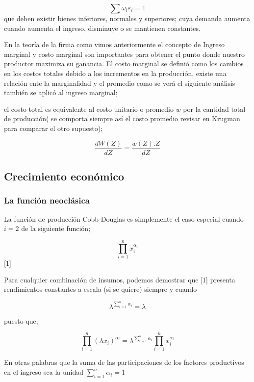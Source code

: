 \documentclass[12pt]{article}
\begin{document}
$$ \sum \omega_{i} \varepsilon_{i}=1 $$  que deben existir bienes inferiores,  normales y superiores; cuya demanda aumenta cuando aumenta el ingreso, disminuye o se mantienen constantes.


En la teoría de la firma como vimos anteriormente el concepto de Ingreso marginal y costo marginal son importantes para obtener el punto donde nuestro productor maximiza su ganancia.  El costo marginal se definió como los cambios en los costos totales debido a los incrementos en la producción, existe una relación ente la marginalidad y el promedio como se verá el siguiente análisis también se aplicó al ingreso marginal;

el costo total es equivalente al costo unitario o promedio $w$ por la cantidad total de producción( se comporta siempre así el costo promedio revisar en Krugman para comparar el otro supuesto); 

$$\dfrac{dW(Z)}{dZ}= \dfrac{w(Z).Z}{dZ}$$








\vspace*{0,9cm}

\subsection{Crecimiento económico}


\subsubsection{La función neoclásica}
La función de producción Cobb-Douglas es simplemente el caso especial cuando $i=2$ de la siguiente función;

$$\prod_{i=1}^n x_i^{\alpha_i}  $$ [1]

Para cualquier combinación de insumos, podemos demostrar que [1] presenta rendimientos constantes a escala (si se quiere) siempre y cuando 

 $$ \lambda^{\sum_{i=1}^n\alpha{_i}}=\lambda $$
 
 
puesto que; 



$$\prod_{i=1}^n \left(\lambda x_i \right)^{\alpha_i}=\lambda^{{\sum_{i=1}^n\alpha_i}}\prod_{i=1}^n x_i^{\alpha_i}$$
 
 
 
 
 En otras palabras que la suma de las participaciones de los factores productivos en el ingreso sea la unidad $\sum_{i=1}^n\alpha{_i}=1$
 
\end{document}

